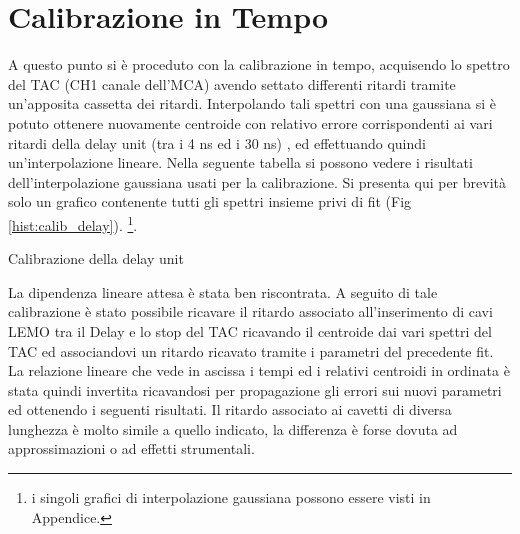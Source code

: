 




\section{Calibrazione in Tempo}

A questo punto si è proceduto con la calibrazione in tempo, acquisendo lo spettro del TAC (CH1 canale dell'MCA) avendo settato differenti ritardi tramite 
un'apposita cassetta dei ritardi. Interpolando tali spettri con una gaussiana si è potuto ottenere nuovamente centroide con relativo 
errore corrispondenti ai vari ritardi della delay unit (tra i 4 ns ed i 30 ns) ,
ed effettuando quindi un'interpolazione lineare. Nella seguente tabella si possono vedere i risultati dell'interpolazione gaussiana usati per la calibrazione. Si presenta qui per brevità solo un grafico contenente tutti gli spettri insieme privi di fit (Fig \ref{hist:calib_delay}). \footnote{i singoli grafici di interpolazione gaussiana possono essere visti in Appendice.}. \\


%
\begin{table}[h]
	\centering
	
	\caption{Calibrazione della delay unit}
	\label{tab:calib_delay}
\end{table}
%
%
%	
%

%

La dipendenza lineare attesa è stata ben riscontrata.
A seguito di tale calibrazione è stato possibile ricavare il ritardo associato all'inserimento di cavi LEMO tra il Delay e lo stop del TAC ricavando il centroide dai vari spettri del 
TAC ed associandovi un ritardo ricavato tramite i parametri del precedente fit. La relazione lineare che vede in ascissa i tempi ed i relativi centroidi in ordinata è stata 
quindi invertita ricavandosi per propagazione gli errori sui nuovi parametri ed ottenendo i seguenti risultati. Il ritardo associato ai cavetti di diversa lunghezza è molto simile
a quello indicato, la differenza è forse dovuta ad approssimazioni o ad effetti strumentali.\\




